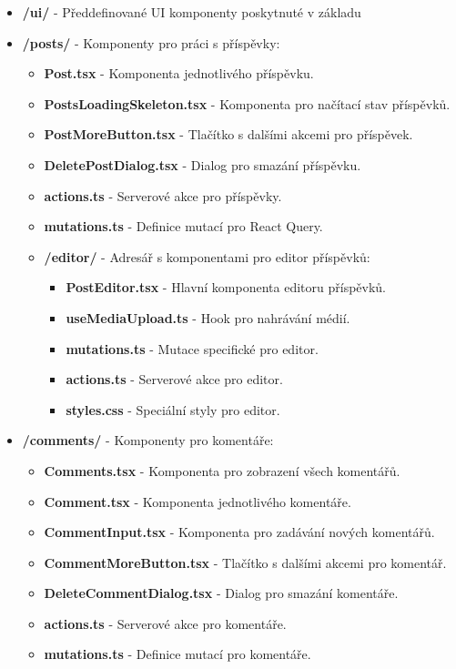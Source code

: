 \documentclass[12pt]{article}
\begin{document}
\begin{itemize}
  \item \textbf{/ui/} - Předdefinované UI komponenty poskytnuté v základu
  
  \item \textbf{/posts/} - Komponenty pro práci s příspěvky:
  \begin{itemize}
    \item \textbf{Post.tsx} - Komponenta jednotlivého příspěvku.
    \item \textbf{PostsLoadingSkeleton.tsx} - Komponenta pro načítací stav příspěvků.
    \item \textbf{PostMoreButton.tsx} - Tlačítko s dalšími akcemi pro příspěvek.
    \item \textbf{DeletePostDialog.tsx} - Dialog pro smazání příspěvku.
    \item \textbf{actions.ts} - Serverové akce pro příspěvky.
    \item \textbf{mutations.ts} - Definice mutací pro React Query.
    \item \textbf{/editor/} - Adresář s komponentami pro editor příspěvků:
    \begin{itemize}
      \item \textbf{PostEditor.tsx} - Hlavní komponenta editoru příspěvků.
      \item \textbf{useMediaUpload.ts} - Hook pro nahrávání médií.
      \item \textbf{mutations.ts} - Mutace specifické pro editor.
      \item \textbf{actions.ts} - Serverové akce pro editor.
      \item \textbf{styles.css} - Speciální styly pro editor.
    \end{itemize}
  \end{itemize}
  
  \item \textbf{/comments/} - Komponenty pro komentáře:
  \begin{itemize}
    \item \textbf{Comments.tsx} - Komponenta pro zobrazení všech komentářů.
    \item \textbf{Comment.tsx} - Komponenta jednotlivého komentáře.
    \item \textbf{CommentInput.tsx} - Komponenta pro zadávání nových komentářů.
    \item \textbf{CommentMoreButton.tsx} - Tlačítko s dalšími akcemi pro komentář.
    \item \textbf{DeleteCommentDialog.tsx} - Dialog pro smazání komentáře.
    \item \textbf{actions.ts} - Serverové akce pro komentáře.
    \item \textbf{mutations.ts} - Definice mutací pro komentáře.
  \end{itemize}
  

\end{itemize}
\end{document}
